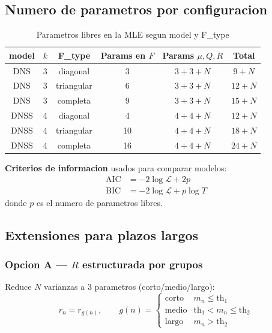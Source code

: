 \documentclass[12pt, a4paper]{article}
\theoremstyle{plain}
\theoremstyle{definition}
\theoremstyle{remark}
\begin{document}
\subsection{Numero de parametros por configuracion}

\begin{table}[H]
\centering
\caption{Parametros libres en la MLE segun model y F\_type}
\label{tab:nparams}
\small
\begin{tabular}{cccccc}
\toprule
\textbf{model} & $k$ & \textbf{F\_type} & \textbf{Params en $F$}
  & \textbf{Params $\mu,Q,R$} & \textbf{Total} \\
\midrule
DNS  & 3 & diagonal   & 3            & $3+3+N$ & $9+N$ \\
DNS  & 3 & triangular & 6            & $3+3+N$ & $12+N$ \\
DNS  & 3 & completa   & 9            & $3+3+N$ & $15+N$ \\
DNSS & 4 & diagonal   & 4            & $4+4+N$ & $12+N$ \\
DNSS & 4 & triangular & 10           & $4+4+N$ & $18+N$ \\
DNSS & 4 & completa   & 16           & $4+4+N$ & $24+N$ \\
\bottomrule
\end{tabular}
\end{table}

\textbf{Criterios de informacion} usados para comparar modelos:
\begin{align}
  \text{AIC} &= -2\log\mathcal{L} + 2p
  \label{eq:aic} \\
  \text{BIC} &= -2\log\mathcal{L} + p\log T
  \label{eq:bic}
\end{align}
donde $p$ es el numero de parametros libres.

\subsection{Extensiones para plazos largos}

\subsubsection{Opcion A --- $R$ estructurada por grupos}

Reduce $N$ varianzas a 3 parametros (corto/medio/largo):
\begin{equation}
  r_n = r_{g(n)}, \qquad
  g(n) = \begin{cases}
    \text{corto} & m_n \leq \text{th}_1 \\
    \text{medio} & \text{th}_1 < m_n \leq \text{th}_2 \\
    \text{largo} & m_n > \text{th}_2
  \end{cases}
  \label{eq:r_grupos}
\end{equation}
\end{document}
